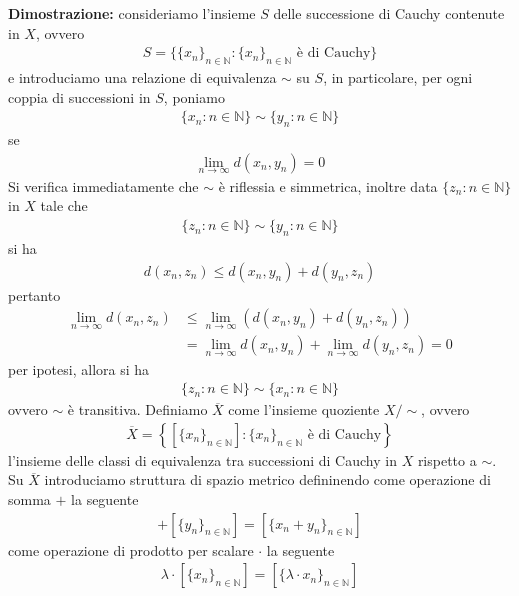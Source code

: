 \documentclass{article}
\numberwithin{equation}{subsection}
\begin{document}
\textbf{Dimostrazione:} consideriamo l'insieme $S$ delle successione di Cauchy contenute in $X$, ovvero 
\begin{align*}
    S = \{\{x_n\}_{n \in \mathbb{N}} : \{x_n\}_{n \in \mathbb{N}} \text{ è di Cauchy}\} 
\end{align*}
e introduciamo una relazione di equivalenza $\sim$ su $S$, in particolare, per ogni coppia di successioni in $S$, poniamo 
\begin{align*}
    \{x_n : n \in \mathbb{N}\} \sim \{y_n : n \in \mathbb{N}\} 
\end{align*}
se 
\begin{align*}
    \lim_{n \rightarrow \infty} d(x_n, y_n) = 0 
\end{align*}
Si verifica immediatamente che $\sim$ è riflessia e simmetrica, inoltre data $\{z_n : n \in \mathbb{N}\}$ in $X$ tale che 
\begin{align*}
    \{z_n : n \in \mathbb{N}\} \sim \{y_n : n \in \mathbb{N}\} 
\end{align*}
si ha 
\begin{align*}
    d(x_n, z_n) \leq d(x_n, y_n) + d(y_n, z_n) 
\end{align*}
pertanto 
\begin{align*}
    \lim_{n \rightarrow \infty}d(x_n, z_n) &\leq \lim_{n \rightarrow \infty}(d(x_n, y_n) + d(y_n, z_n))  \\
    &= \lim_{n\rightarrow \infty}d(x_n, y_n) + \lim_{n \rightarrow \infty}d(y_n, z_n) = 0 
\end{align*}
per ipotesi, allora si ha 
\begin{align*}
    \{z_n : n \in \mathbb{N}\} \sim \{x_n : n \in \mathbb{N}\} 
\end{align*}
ovvero $\sim$ è transitiva. Definiamo $\overline{X}$ come l'insieme quoziente $X/\sim$, ovvero 
\begin{align*}
    \overline{X} = \left\{\left[\{x_n\}_{n \in \mathbb{N}}\right] : \{x_n\}_{n \in \mathbb{N}} \text{ è di Cauchy}\right\} 
\end{align*}
l'insieme delle classi di equivalenza tra successioni di Cauchy in $X$ rispetto a $\sim$. Su $\overline{X}$ introduciamo struttura di spazio metrico defininendo come operazione di somma $+$ la seguente 
\begin{align*}
    [\{x_n\}_{n \in \mathbb{N}}] + [\{y_n\}_{n \in \mathbb{N}}] = [\{x_n + y_n\}_{n \in \mathbb{N}}] 
\end{align*}
come operazione di prodotto per scalare $\cdot$ la seguente 
\begin{align*}
    \lambda \cdot [\{x_n\}_{n \in \mathbb{N}}] = [\{\lambda \cdot x_n\}_{n \in \mathbb{N}}] 
\end{align*}
\end{document}
